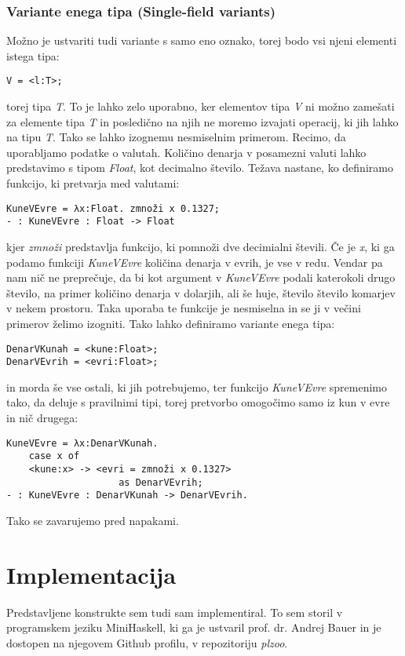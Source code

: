 \documentclass[12pt,a4paper,openany]{book}
\begin{document}
\subsection{Variante enega tipa (Single-field variants)}
Možno je ustvariti tudi variante s samo eno oznako, torej bodo vsi njeni elementi istega tipa:
\begin{lstlisting}
V = <l:T>;
\end{lstlisting}
torej tipa \emph{T}. To je lahko zelo uporabno, ker elementov tipa \emph{V} ni možno zamešati za elemente tipa \emph{T} in posledično na njih ne moremo izvajati operacij, ki jih lahko na tipu 
\emph{T}. Tako se lahko izognemu nesmiselnim primerom. Recimo, da uporabljamo podatke o valutah. Količino denarja v posamezni valuti lahko predstavimo s tipom \emph{Float}, kot decimalno 
število. Težava nastane, ko definiramo funkcijo, ki pretvarja med valutami:
\begin{lstlisting}
KuneVEvre = λx:Float. zmnoži x 0.1327;
- : KuneVEvre : Float -> Float
\end{lstlisting}
kjer \emph{zmnoži} predstavlja funkcijo, ki pomnoži dve decimialni števili. Če je \emph{x}, ki ga podamo funkciji \emph{KuneVEvre} količina denarja v evrih, je vse v redu. Vendar pa nam nič ne 
preprečuje, da bi kot argument v \emph{KuneVEvre} podali katerokoli drugo število, na primer količino denarja v dolarjih, ali še huje, število število komarjev v nekem prostoru. Taka uporaba te 
funkcije je nesmiselna in se ji v večini primerov želimo izogniti. Tako lahko definiramo variante enega tipa:
\begin{lstlisting}
DenarVKunah = <kune:Float>;
DenarVEvrih = <evri:Float>;
\end{lstlisting}
in morda še vse ostali, ki jih potrebujemo, ter funkcijo \emph{KuneVEvre} spremenimo tako, da deluje s pravilnimi tipi, torej pretvorbo omogočimo 
samo iz kun v evre in nič drugega:
\begin{lstlisting}
KuneVEvre = λx:DenarVKunah.
    case x of 
    <kune:x> -> <evri = zmnoži x 0.1327> 
                    as DenarVEvrih;
- : KuneVEvre : DenarVKunah -> DenarVEvrih.
\end{lstlisting}
Tako se zavarujemo pred napakami.
\newpage

\chapter{Implementacija}
Predstavljene konstrukte sem tudi sam implementiral. To sem storil v programskem jeziku MiniHaskell, ki ga je ustvaril prof. dr. Andrej Bauer in 
je dostopen na njegovem Github profilu, v repozitoriju \emph{plzoo}. 
\end{document}
